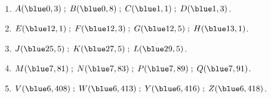    \ \\ [-5mm]
   \begin{enumerate}
      \item $A({\blue 0,3}) \; ; \; B({\blue 0,8}) \; ; \; C({\blue 1,1}) \; ; \; D({\blue 1,3})$.
      \item $E({\blue 12,1}) \; ; \; F({\blue 12,3}) \; ; \; G({\blue 12,5}) \; ; \; H({\blue 13,1})$.
      \item $J({\blue 25,5}) \; ; \; K({\blue 27,5}) \; ; \; L({\blue 29,5})$.
      \item $M({\blue 7,81}) \; ; \; N({\blue 7,83}) \; ; \; P({\blue 7,89}) \; ; \; Q({\blue 7,91})$.
      \item $V({\blue 6,408}) \; ; \; W({\blue 6,413}) \; ; \; Y({\blue 6,416}) \; ; \; Z({\blue 6,418})$.
   \end{enumerate}
